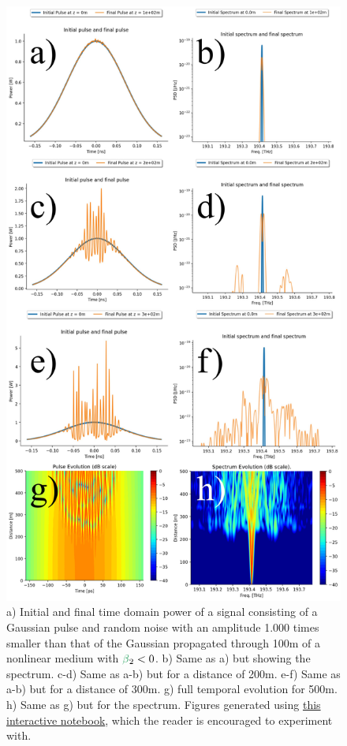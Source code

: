 \begin{figure}
    \centering
    \includegraphics[width=0.75\linewidth]{figures/MI_combined.png}
    \caption{a) Initial and final time domain power of a signal consisting of a Gaussian pulse and random noise with an amplitude 1.000 times smaller than that of the Gaussian propagated through 100m of a nonlinear medium with $\betag_2<0$. b) Same as a) but showing the spectrum. c-d) Same as a-b) but for a distance of 200m. e-f) Same as a-b) but for a distance of 300m. g) full temporal evolution for 500m. h) Same as g) but for the spectrum. Figures generated using \href{https://colab.research.google.com/drive/1p2aQZ4zPPAIMplVxvlezdmpQt_j-rsY7?usp=sharing}{this interactive notebook}, which the reader is encouraged to experiment with.}
    \label{fig:MI}
\end{figure}



